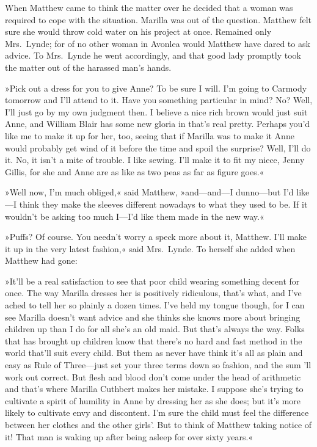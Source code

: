 When Matthew came to think the matter over he decided that a woman was required to cope with the situation. Marilla was out of the question. Matthew felt sure she would throw cold water on his project at once. Remained only Mrs.~Lynde; for of no other woman in Avonlea would Matthew have dared to ask advice. To Mrs.~Lynde he went accordingly, and that good lady promptly took the matter out of the harassed man's hands.

»Pick out a dress for you to give Anne? To be sure I will. I'm going to Carmody tomorrow and I'll attend to it. Have you something particular in mind? No? Well, I'll just go by my own judgment then. I believe a nice rich brown would just suit Anne, and William Blair has some new gloria in that's real pretty. Perhaps you'd like me to make it up for her, too, seeing that if Marilla was to make it Anne would probably get wind of it before the time and spoil the surprise? Well, I'll do it. No, it isn't a mite of trouble. I like sewing. I'll make it to fit my niece, Jenny Gillis, for she and Anne are as like as two peas as far as figure goes.«

»Well now, I'm much obliged,« said Matthew, »and—and—I dunno—but I'd like—I think they make the sleeves different nowadays to what they used to be. If it wouldn't be asking too much I—I'd like them made in the new way.«

»Puffs? Of course. You needn't worry a speck more about it, Matthew. I'll make it up in the very latest fashion,« said Mrs.~Lynde. To herself she added when Matthew had gone:

»It'll be a real satisfaction to see that poor child wearing something decent for once. The way Marilla dresses her is positively ridiculous, that's what, and I've ached to tell her so plainly a dozen times. I've held my tongue though, for I can see Marilla doesn't want advice and she thinks she knows more about bringing children up than I do for all she's an old maid. But that's always the way. Folks that has brought up children know that there's no hard and fast method in the world that'll suit every child. But them as never have think it's all as plain and easy as Rule of Three—just set your three terms down so fashion, and the sum 'll work out correct. But flesh and blood don't come under the head of arithmetic and that's where Marilla Cuthbert makes her mistake. I suppose she's trying to cultivate a spirit of humility in Anne by dressing her as she does; but it's more likely to cultivate envy and discontent. I'm sure the child must feel the difference between her clothes and the other girls'. But to think of Matthew taking notice of it! That man is waking up after being asleep for over sixty years.«

